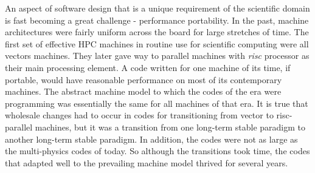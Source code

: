 \label{sec:future}

An aspect of software design that is a unique requirement of
the scientific domain is fast becoming a great challenge - performance
portability. In the past, machine architectures were fairly uniform
across the board for large stretches of time.  The first set of
effective HPC machines in routine use for scientific computing were
all vectors machines. They later gave way to parallel machines with
{\em risc} processor as their main processing element. A code written
for one machine of its time, if portable, would have reasonable
performance on most of its contemporary machines. The abstract machine
model to which the codes of the era were programming was essentially
the same for all machines of that era. It is true that wholesale changes had to occur
in codes for transitioning from vector to risc-parallel machines, but
it was a transition from one long-term stable paradigm to another
long-term stable paradigm.  In addition, the codes were not as large as the
multi-physics codes of today. So although the transitions took time, the
codes that adapted well to the prevailing machine model thrived for
several years.  

